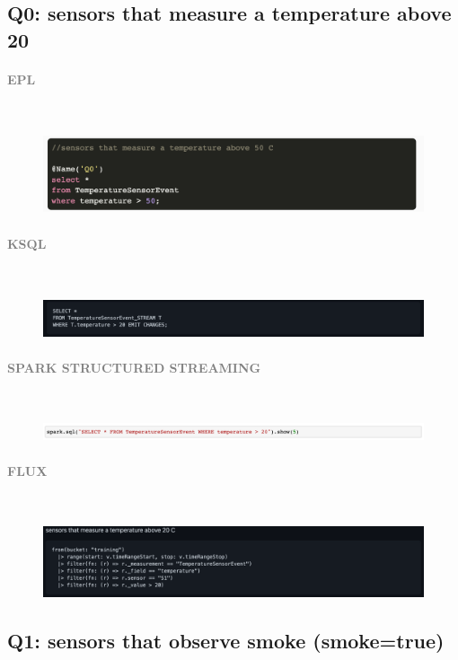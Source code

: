\documentclass[10pt,a4paper]{article}
\newcommand{\myparagraph}[1]{\paragraph{\normalsize{\textcolor{gray}{\uppercase{\textbf{#1}}}} }\mbox{} \vspace{0.5em}\\}
\begin{document}
\subsection{Q0: sensors that measure a temperature above 20}
\myparagraph{EPL}
\begin{figure}[h!]
 \hfill \includegraphics[width=400pt]{images/epl_Q0}\hspace*{\fill}
\end{figure}
\myparagraph{KSQL}
\begin{figure}[h!]
 \hfill \includegraphics[width=400pt]{images/ksql_Q0}\hspace*{\fill}
\end{figure}
\myparagraph{Spark Structured Streaming}
\begin{figure}[h!]
 \hfill \includegraphics[width=400pt]{images/sss_Q0}\hspace*{\fill}
\end{figure}
\myparagraph{Flux}
\begin{figure}[h!]
 \hfill \includegraphics[width=400pt]{images/flux_Q0}\hspace*{\fill}
\end{figure}

\pagebreak

\subsection{Q1: sensors that observe smoke (smoke=true)}
\end{document}
